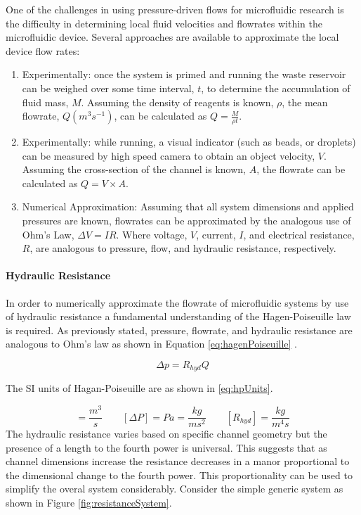 One of the challenges in using pressure-driven flows for microfluidic research is the difficulty in determining local fluid velocities and flowrates within the microfluidic device. Several approaches are available to approximate the local device flow rates:
\begin{enumerate}
\item Experimentally: once the system is primed and running the waste reservoir can be weighed over some time interval, $t$, to determine the accumulation of fluid mass, $M$. Assuming the density of reagents is known, $\rho$, the mean flowrate, $Q (m^3s^{-1})$, can be calculated as $Q = \frac{M}{\rho t}$.
\item Experimentally: while running, a visual indicator (such as beads, or droplets) can be measured by high speed camera to obtain an object velocity, $V$. Assuming the cross-section of the channel is known, $A$, the flowrate can be calculated as $Q = V \times A$.
\item Numerical Approximation: Assuming that all system dimensions and applied pressures are known, flowrates can be approximated by the analogous use of Ohm's Law, $\Delta V=IR$. Where voltage, $V$, current, $I$, and electrical resistance, $R$, are analogous to pressure, flow, and hydraulic resistance, respectively.
\end{enumerate}


\paragraph{Hydraulic Resistance} In order to numerically approximate the flowrate of microfluidic systems by use of hydraulic resistance a fundamental understanding of the Hagen-Poiseuille law is required. As previously stated, pressure, flowrate, and hydraulic resistance are analogous to Ohm's law as shown in Equation \vref{eq:hagenPoiseuille} \cite{Bruus2008}.

\begin{equation}
\Delta p  = R_{hyd} Q
\label{eq:hagenPoiseuille}
\end{equation}

The SI units of Hagan-Poiseuille are as shown in \vref{eq:hpUnits}.

\begin{equation}
[Q] = \frac{m^3}{s} \qquad [\Delta P] = Pa = \frac{kg}{m s^2}  \qquad [R_{hyd}]= \frac{kg}{m^4 s}
\label{eq:hpUnits}
\end{equation}
The hydraulic resistance varies based on specific channel geometry but the presence of a length to the fourth power is universal. This suggests that as channel dimensions increase the resistance decreases in a manor proportional to the dimensional change to the fourth power. This proportionality can be used to simplify the overal system considerably. Consider the simple generic system as shown in Figure \vref{fig:resistanceSystem}.



